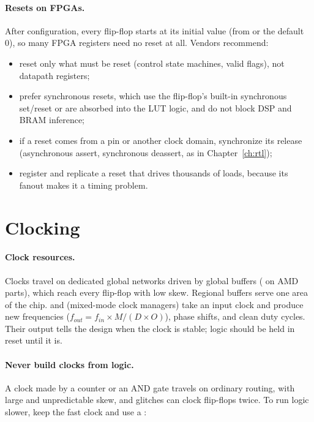 \paragraph{Resets on FPGAs.} After configuration, every flip-flop starts at its initial value (from  or the default 0), so many FPGA registers need no reset at all. Vendors recommend:
\begin{itemize}
  \item reset only what must be reset (control state machines, valid flags), not datapath registers;
  \item prefer synchronous resets, which use the flip-flop's built-in synchronous set/reset or are absorbed into the LUT logic, and do not block DSP and BRAM inference;
  \item if a reset comes from a pin or another clock domain, synchronize its release (asynchronous assert, synchronous deassert, as in Chapter~\ref{ch:rtl});
  \item register and replicate a reset that drives thousands of loads, because its fanout makes it a timing problem.
\end{itemize}

\section{Clocking}

\paragraph{Clock resources.} Clocks travel on dedicated global networks driven by global buffers ( on AMD parts), which reach every flip-flop with low skew. Regional buffers serve one area of the chip.  and  (mixed-mode clock managers) take an input clock and produce new frequencies ($f_{out} = f_{in} \times M / (D \times O)$), phase shifts, and clean duty cycles. Their  output tells the design when the clock is stable; logic should be held in reset until it is.

\paragraph{Never build clocks from logic.} A clock made by a counter or an AND gate travels on ordinary routing, with large and unpredictable skew, and glitches can clock flip-flops twice. To run logic slower, keep the fast clock and use a :

